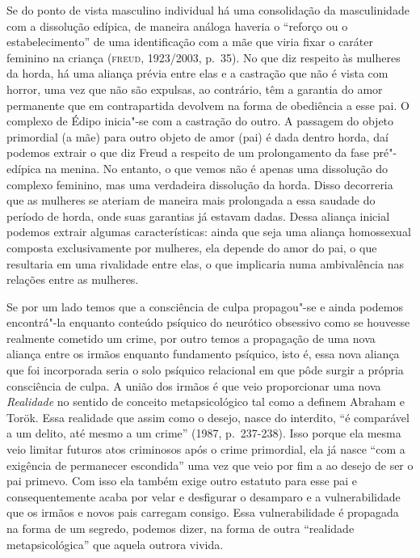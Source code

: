 Se do ponto de vista masculino individual há uma consolidação da
masculinidade com a dissolução edípica, de maneira análoga haveria o
``reforço ou o estabelecimento'' de uma identificação com a mãe que
viria fixar o caráter feminino na criança (\textsc{freud}, 1923/2003, p.~35). No
que diz respeito às mulheres da horda, há uma aliança prévia entre elas
e a castração que não é vista com horror, uma vez que não são expulsas, ao
contrário, têm a garantia do amor permanente que em contrapartida
devolvem na forma de obediência a esse pai. O complexo de Édipo
inicia"-se com a castração do outro. A passagem do objeto primordial (a
mãe) para outro objeto de amor (pai) é dada dentro horda, daí podemos
extrair o que diz Freud a respeito de um prolongamento da fase
pré"-edípica na menina. No entanto, o que vemos não é apenas uma
dissolução do complexo feminino, mas uma verdadeira dissolução da horda.
Disso decorreria que as mulheres se ateriam de maneira mais prolongada a
essa saudade do período de horda, onde suas garantias já estavam dadas.
Dessa aliança inicial podemos extrair algumas características: ainda que
seja uma aliança homossexual composta exclusivamente por mulheres, ela
depende do amor do pai, o que resultaria em uma rivalidade entre elas, o
que implicaria numa ambivalência nas relações entre as mulheres.

Se por um lado temos que a consciência de culpa propagou"-se e ainda
podemos encontrá"-la enquanto conteúdo psíquico do neurótico obsessivo
como se houvesse realmente cometido um crime, por outro temos a
propagação de uma nova aliança entre os irmãos enquanto fundamento
psíquico, isto é, essa nova aliança que foi incorporada seria o solo
psíquico relacional em que pôde surgir a própria consciência de culpa. A
união dos irmãos é que veio proporcionar uma nova \emph{Realidade} no
sentido de conceito metapsicológico tal como a definem Abraham e Torök.
Essa realidade que assim como o
desejo, nasce do interdito, ``é comparável a um delito, até mesmo a um
crime'' (1987, p.~237-238). Isso porque ela mesma veio limitar futuros
atos criminosos após o crime primordial, ela já nasce ``com a exigência
de permanecer escondida'' uma vez que veio por fim a ao desejo de ser o
pai primevo. Com isso ela também exige outro estatuto para esse pai e
consequentemente acaba por velar e desfigurar o desamparo e a
vulnerabilidade que os irmãos e novos pais carregam consigo. Essa
vulnerabilidade é propagada na forma de um segredo, podemos dizer, na
forma de outra ``realidade metapsicológica'' que aquela outrora vivida.


